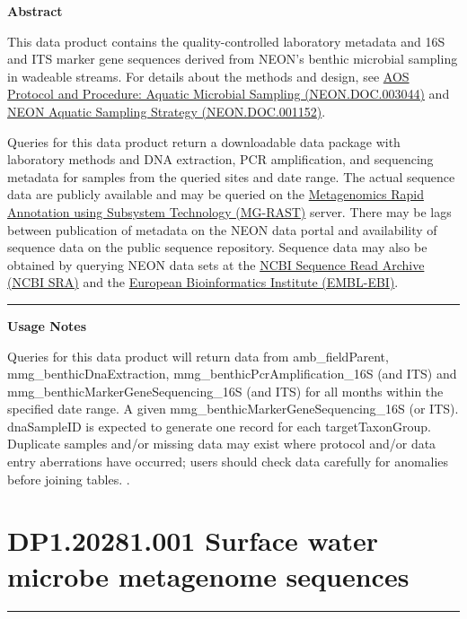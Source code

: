 \documentclass[]{article}
\begin{document}
\textbf{Abstract}

This data product contains the quality-controlled laboratory metadata
and 16S and ITS marker gene sequences derived from NEON's benthic
microbial sampling in wadeable streams. For details about the methods
and design, see
\href{http://data.neonscience.org/api/v0/documents/NEON.DOC.003044vB}{AOS
Protocol and Procedure: Aquatic Microbial Sampling (NEON.DOC.003044)}
and
\href{http://data.neonscience.org/api/v0/documents/NEON.DOC.001152vA}{NEON
Aquatic Sampling Strategy (NEON.DOC.001152)}.

Queries for this data product return a downloadable data package with
laboratory methods and DNA extraction, PCR amplification, and sequencing
metadata for samples from the queried sites and date range. The actual
sequence data are publicly available and may be queried on the
\href{http://metagenomics.anl.gov/}{Metagenomics Rapid Annotation using
Subsystem Technology (MG-RAST)} server. There may be lags between
publication of metadata on the NEON data portal and availability of
sequence data on the public sequence repository. Sequence data may also
be obtained by querying NEON data sets at the
\href{https://www.ncbi.nlm.nih.gov/sra}{NCBI Sequence Read Archive (NCBI
SRA)} and the \href{https://www.ebi.ac.uk/}{European Bioinformatics
Institute (EMBL-EBI)}.

\begin{center}\rule{0.5\linewidth}{\linethickness}\end{center}

\textbf{Usage Notes}

Queries for this data product will return data from amb\_fieldParent,
mmg\_benthicDnaExtraction, mmg\_benthicPcrAmplification\_16S (and ITS)
and mmg\_benthicMarkerGeneSequencing\_16S (and ITS) for all months
within the specified date range. A given
mmg\_benthicMarkerGeneSequencing\_16S (or ITS). dnaSampleID is expected
to generate one record for each targetTaxonGroup. Duplicate samples
and/or missing data may exist where protocol and/or data entry
aberrations have occurred; users should check data carefully for
anomalies before joining tables. \newpage
.

\section{DP1.20281.001 Surface water microbe metagenome
sequences}\label{dp1.20281.001-surface-water-microbe-metagenome-sequences}

\begin{center}\rule{0.5\linewidth}{\linethickness}\end{center}
\end{document}
